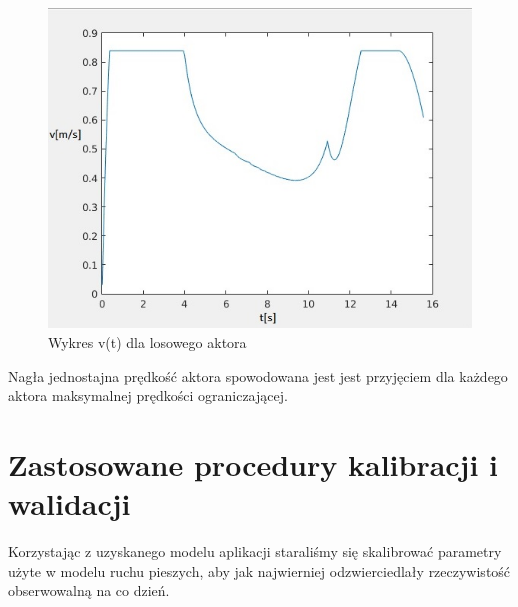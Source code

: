 \begin{figure}[h]
\centering
\includegraphics[scale=0.4]{wykres}
\caption{Wykres v(t) dla losowego aktora}
\end{figure}

Nagła jednostajna prędkość aktora spowodowana jest jest przyjęciem dla każdego aktora maksymalnej prędkości ograniczającej.
\newpage
\section{Zastosowane procedury kalibracji i walidacji}

Korzystając z uzyskanego modelu aplikacji staraliśmy się skalibrować parametry użyte w modelu ruchu pieszych, aby jak najwierniej odzwierciedlały rzeczywistość obserwowalną na co dzień.